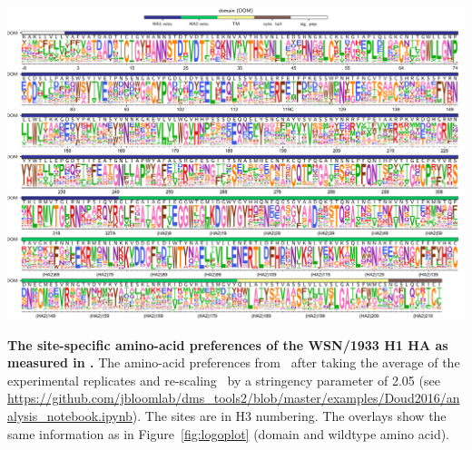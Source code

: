 \documentclass[9pt,twocolumn,twoside]{pnas-new-for-biorxiv}
\begin{document}
\begin{suppfigure}[H]
\centerline{\includegraphics[width=\textwidth]{figs/supp_WSNprefs_logoplot/WSN-rescaled_prefs.pdf}}
\caption{\label{suppfig:WSNprefs_logoplot}
{\bf The site-specific amino-acid preferences of the WSN/1933 H1 HA as measured in \cite{doud2016accurate}.}
The amino-acid preferences from~\cite{doud2016accurate} after taking the average of the experimental replicates and re-scaling~\cite{hilton2017phydms} by a stringency parameter of 2.05 (see \url{https://github.com/jbloomlab/dms_tools2/blob/master/examples/Doud2016/analysis_notebook.ipynb}).
The sites are in H3 numbering.
The overlays show the same information as in Figure~\ref{fig:logoplot} (domain and wildtype amino acid).
}
\end{suppfigure}
\end{document}
